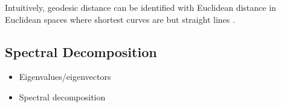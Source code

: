 Intuitively, geodesic distance can be identified with Euclidean distance in
Euclidean spaces where shortest curves are but straight lines \citep{mafu2011}.

\subsection{Spectral Decomposition}
\label{spect-dec}

\begin{itemize}
  \item Eigenvalues/eigenvectors 
  \item Spectral decomposition
\end{itemize}



